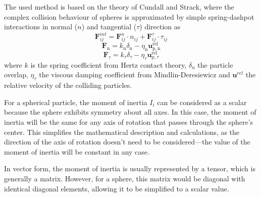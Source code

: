 The used method is based on the theory of Cundall and Strack\cite{cundall1979discrete}, where the complex collision behaviour of spheres is approximated by simple spring-dashpot interactions in normal ($n$) and tangential ($\tau$) direction as
\begin{equation}
\boldsymbol{F}_{i j}^{int}=\boldsymbol{F}_{i j}^{n} \cdot n_{i j}+\boldsymbol{F}_{i j}^{\tau} \cdot \tau_{i j}
\end{equation}
\begin{equation}
    \boldsymbol{F}_{\mathrm{n}}=k_{\mathrm{n}} \delta_{\mathrm{n}}-\eta_{\mathrm{n}} \boldsymbol{u}_{\mathrm{p}, \mathrm{n}}^{\mathrm{rel}}
\end{equation}
\begin{equation}
    \boldsymbol{F}_{\tau}=k_{\tau} \delta_{\tau}-\eta_{\tau} \boldsymbol{u}_{\mathrm{p},{\tau}}^{\mathrm{rel}}
\end{equation}
where $k$ is the spring coefficient from Hertz contact theory, $\delta_n$ the particle overlap, $\eta_{\tau}$ the viscous damping coefficient from Mindlin-Deresiewicz \cite{mindlin1953elastic} and $\mathbf{u}^{rel}$ the relative velocity of the colliding particles.

For a spherical particle, the moment of inertia \( I_i \) can be considered as a scalar because the sphere exhibits symmetry about all axes. In this case, the moment of inertia will be the same for any axis of rotation that passes through the sphere's center. This simplifies the mathematical description and calculations, as the direction of the axis of rotation doesn't need to be considered—the value of the moment of inertia will be constant in any case.

In vector form, the moment of inertia is usually represented by a tensor, which is generally a matrix. However, for a sphere, this matrix would be diagonal with identical diagonal elements, allowing it to be simplified to a scalar value.

